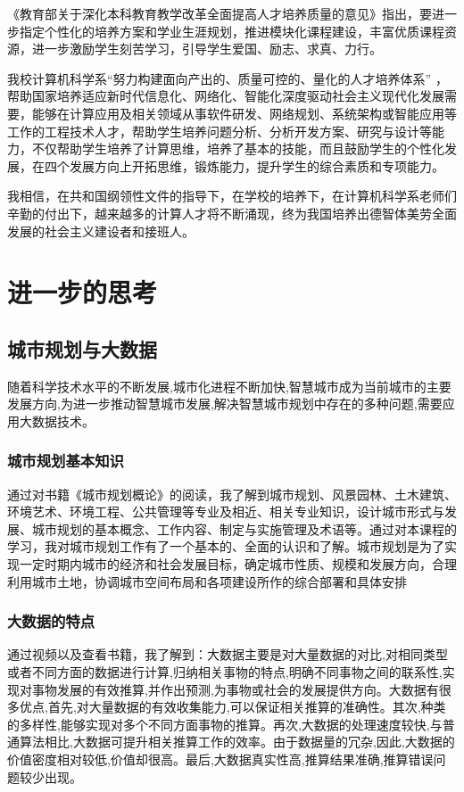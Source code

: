 \documentclass{article}
\begin{document}
《教育部关于深化本科教育教学改革全面提高人才培养质量的意见》\cite{ref4}指出，要进一步指定个性化的培养方案和学业生涯规划，推进模块化课程建设，丰富优质课程资源，进一步激励学生刻苦学习，引导学生爱国、励志、求真、力行。

我校计算机科学系“努力构建面向产出的、质量可控的、量化的人才培养体系” \cite{ref5}，帮助国家培养适应新时代信息化、网络化、智能化深度驱动社会主义现代化发展需要，能够在计算应用及相关领域从事软件研发、网络规划、系统架构或智能应用等工作的工程技术人才，帮助学生培养问题分析、分析开发方案、研究与设计等能力，不仅帮助学生培养了计算思维，培养了基本的技能，而且鼓励学生的个性化发展，在四个发展方向上开拓思维，锻炼能力，提升学生的综合素质和专项能力。

我相信，在共和国纲领性文件的指导下，在学校的培养下，在计算机科学系老师们辛勤的付出下，越来越多的计算人才将不断涌现，终为我国培养出德智体美劳全面发展的社会主义建设者和接班人。

\section{进一步的思考}

\subsection{城市规划与大数据}

随着科学技术水平的不断发展,城市化进程不断加快,智慧城市成为当前城市的主要发展方向,为进一步推动智慧城市发展,解决智慧城市规划中存在的多种问题,需要应用大数据技术。

\subsubsection{城市规划基本知识}

通过对书籍《城市规划概论》\cite{ref6}的阅读，我了解到城市规划、风景园林、土木建筑、环境艺术、环境工程、公共管理等专业及相近、相关专业知识，设计城市形式与发展、城市规划的基本概念、工作内容、制定与实施管理及术语等。通过对本课程的学习，我对城市规划工作有了一个基本的、全面的认识和了解。城市规划是为了实现一定时期内城市的经济和社会发展目标，确定城市性质、规模和发展方向，合理利用城市土地，协调城市空间布局和各项建设所作的综合部署和具体安排

\subsubsection{大数据的特点}

通过视频以及查看书籍，我了解到：大数据主要是对大量数据的对比,对相同类型或者不同方面的数据进行计算,归纳相关事物的特点,明确不同事物之间的联系性,实现对事物发展的有效推算,并作出预测,为事物或社会的发展提供方向。大数据有很多优点,首先,对大量数据的有效收集能力,可以保证相关推算的准确性。其次,种类的多样性,能够实现对多个不同方面事物的推算。再次,大数据的处理速度较快,与普通算法相比,大数据可提升相关推算工作的效率。由于数据量的冗杂,因此,大数据的价值密度相对较低,价值却很高。最后,大数据真实性高,推算结果准确,推算错误问题较少出现。
\end{document}
